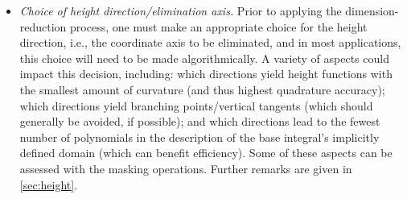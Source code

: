 \documentclass[onefignum,onetabnum,onealgnum,oneeqnum]{siamart190516}
\begin{document}
\begin{itemize}
\item \textit{Choice of height direction/elimination axis.} Prior to applying the dimension-reduction process, one must make an appropriate choice for the height direction, i.e., the coordinate axis to be eliminated, and in most applications, this choice will need to be made algorithmically. A variety of aspects could impact this decision, including: which directions yield height functions with the smallest amount of curvature (and thus highest quadrature accuracy); which directions yield branching points/vertical tangents (which should generally be avoided, if possible); and which directions lead to the fewest number of polynomials in the description of the base integral's implicitly defined domain (which can benefit efficiency). Some of these aspects can be assessed with the masking operations. Further remarks are given in \cref{sec:height}.
\end{itemize}
\end{document}
